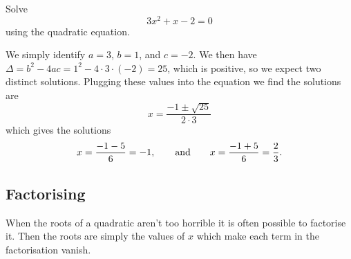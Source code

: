 \documentclass[fleqn]{LectureClass/LectureClass}
\begin{document}
    \begin{exm}{}{}
        Solve
        \begin{equation}
            3x^2 + x - 2 = 0
        \end{equation}
        using the quadratic equation.
        
        We simply identify \(a = 3\), \(b = 1\), and \(c = -2\).
        We then have \(\Delta = b^2 - 4ac = 1^2 - 4 \cdot 3 \cdot (-2) = 25\), which is positive, so we expect two distinct solutions.
        Plugging these values into the equation we find the solutions are
        \begin{equation}
            x = \frac{-1 \pm \sqrt{25}}{2 \cdot 3}
        \end{equation}
        which gives the solutions
        \begin{equation}
            x = \frac{-1 - 5}{6} = -1, \qquad\text{and}\qquad x = \frac{-1 + 5}{6} = \frac{2}{3}.
        \end{equation}
    \end{exm}
    
    \subsection{Factorising}
    When the roots of a quadratic aren't too horrible it is often possible to factorise it.
    Then the roots are simply the values of \(x\) which make each term in the factorisation vanish.
    
\end{document}
